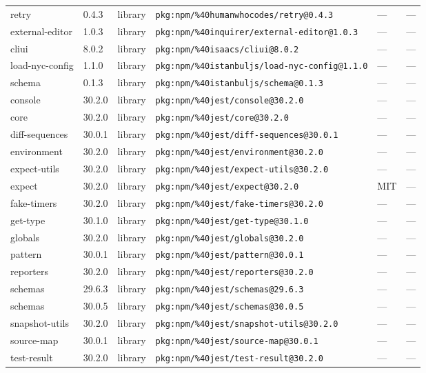 \documentclass[11pt]{article}
\begin{document}
\begin{longtable}{|l|l|l|p{2.2cm}|l|p{4cm}|}
retry & 0.4.3 & library & \texttt{pkg:npm/\%40humanwhocodes/retry@0.4.3} & — & — \\
external-editor & 1.0.3 & library & \texttt{pkg:npm/\%40inquirer/external-editor@1.0.3} & — & — \\
cliui & 8.0.2 & library & \texttt{pkg:npm/\%40isaacs/cliui@8.0.2} & — & — \\
load-nyc-config & 1.1.0 & library & \texttt{pkg:npm/\%40istanbuljs/load-nyc-config@1.1.0} & — & — \\
schema & 0.1.3 & library & \texttt{pkg:npm/\%40istanbuljs/schema@0.1.3} & — & — \\
console & 30.2.0 & library & \texttt{pkg:npm/\%40jest/console@30.2.0} & — & — \\
core & 30.2.0 & library & \texttt{pkg:npm/\%40jest/core@30.2.0} & — & — \\
diff-sequences & 30.0.1 & library & \texttt{pkg:npm/\%40jest/diff-sequences@30.0.1} & — & — \\
environment & 30.2.0 & library & \texttt{pkg:npm/\%40jest/environment@30.2.0} & — & — \\
expect-utils & 30.2.0 & library & \texttt{pkg:npm/\%40jest/expect-utils@30.2.0} & — & — \\
expect & 30.2.0 & library & \texttt{pkg:npm/\%40jest/expect@30.2.0} & MIT & — \\
fake-timers & 30.2.0 & library & \texttt{pkg:npm/\%40jest/fake-timers@30.2.0} & — & — \\
get-type & 30.1.0 & library & \texttt{pkg:npm/\%40jest/get-type@30.1.0} & — & — \\
globals & 30.2.0 & library & \texttt{pkg:npm/\%40jest/globals@30.2.0} & — & — \\
pattern & 30.0.1 & library & \texttt{pkg:npm/\%40jest/pattern@30.0.1} & — & — \\
reporters & 30.2.0 & library & \texttt{pkg:npm/\%40jest/reporters@30.2.0} & — & — \\
schemas & 29.6.3 & library & \texttt{pkg:npm/\%40jest/schemas@29.6.3} & — & — \\
schemas & 30.0.5 & library & \texttt{pkg:npm/\%40jest/schemas@30.0.5} & — & — \\
snapshot-utils & 30.2.0 & library & \texttt{pkg:npm/\%40jest/snapshot-utils@30.2.0} & — & — \\
source-map & 30.0.1 & library & \texttt{pkg:npm/\%40jest/source-map@30.0.1} & — & — \\
test-result & 30.2.0 & library & \texttt{pkg:npm/\%40jest/test-result@30.2.0} & — & — \\

\end{longtable}
\end{document}

